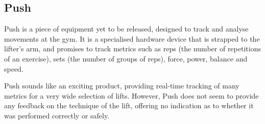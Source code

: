 \subsection{Push}

Push\cite{push} is a piece of equipment yet to be released, designed to track and analyse movements at the gym. It is a specialised hardware device that is strapped to the lifter's arm, and promises to track metrics such as reps (the number of repetitions of an exercise), sets (the number of groups of reps), force, power, balance and speed.

Push sounds like an exciting product, providing real-time tracking of many metrics for a very wide selection of lifts. However, Push does not seem to provide any feedback on the technique of the lift, offering no indication as to whether it was performed correctly or safely.
